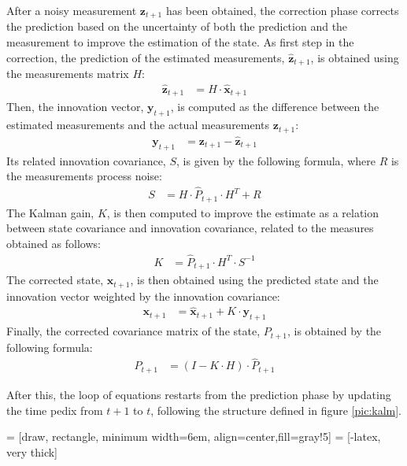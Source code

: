 After a noisy measurement $\mathbf{z}_{t+1}$ has been obtained, the correction phase corrects the prediction based on the uncertainty of both the prediction and the measurement to improve the estimation of the state.
As first step in the correction, the prediction of the estimated measurements, $\hat{\mathbf{z}}_{t+1}$, is obtained using the measurements matrix $H$:
    \begin{align}
    \hat{\mathbf{z}}_{t+1} & = H \cdot \hat{\mathbf{x}}_{t+1}
    \label{eq:pred-measure}
    \end{align}
Then, the innovation vector, $\mathbf{y}_{t+1}$, is computed as the difference between the estimated measurements and the actual measurements $\mathbf{z}_{t+1}$:
    \begin{align}
    \mathbf{y}_{t+1} & = \mathbf{z}_{t+1} - \hat{\mathbf{z}}_{t+1}
    \end{align}
Its related innovation covariance, $S$, is given by the following formula, where $R$ is the measurements process noise:
    \begin{align}
    S & = H \cdot \hat{P}_{t+1} \cdot H^T + R
    \end{align}
The Kalman gain, $K$, is then computed to improve the estimate as a relation between state covariance and innovation covariance, related to the measures obtained as follows:
    \begin{align}
    K & = \hat{P}_{t+1} \cdot H^T \cdot S^{-1} 
    \end{align}
The corrected state, $\mathbf{x}_{t+1}$, is then obtained using the predicted state and the innovation vector weighted by the innovation covariance:
    \begin{align}
    \mathbf{x}_{t+1} & = \hat{\mathbf{x}}_{t+1} + K \cdot \mathbf{y}_{t+1}
    \end{align}
Finally, the corrected covariance matrix of the state, $P_{t+1}$, is obtained by the following formula:
    \begin{align}
    P_{t+1} & = (I - K \cdot H) \cdot \hat{P}_{t+1}
    \end{align}

After this, the loop of equations restarts from the prediction phase by updating the time pedix from $t+1$ to $t$, following the structure defined in figure \ref{pic:kalm}.

 = [draw, rectangle, minimum width=6em, align=center,fill=gray!5]
 = [-latex, very thick]
\newcommand*{\tran}{\top}


